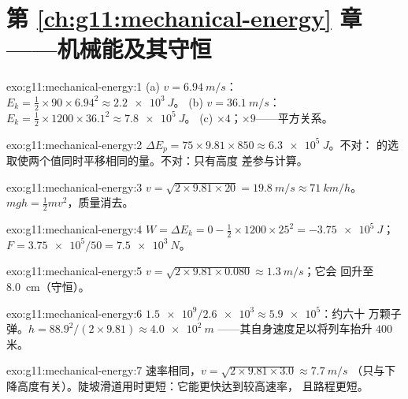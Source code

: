 \section*{第 \ref{ch:g11:mechanical-energy} 章——机械能及其守恒}

\begin{solution}{exo:g11:mechanical-energy:1}
(a) $v = \qty{6.94}{m/s}$：
$E_k = \tfrac12 \times 90 \times 6.94^2 \approx \qty{2.2e3}{J}$。
(b) $v = \qty{36.1}{m/s}$：
$E_k = \tfrac12 \times 1200 \times 36.1^2 \approx \qty{7.8e5}{J}$。
(c) $\times 4$；$\times 9$——平方关系。
\end{solution}

\begin{solution}{exo:g11:mechanical-energy:2}
$\Delta E_p = 75 \times 9.81 \times 850 \approx \qty{6.3e5}{J}$。不对：
的选取使两个值同时平移相同的量。不对：只有高度
差参与计算。
\end{solution}

\begin{solution}{exo:g11:mechanical-energy:3}
$v = \sqrt{2 \times 9.81 \times 20} = \qty{19.8}{m/s} \approx
\qty{71}{km/h}$。$mgh = \tfrac12 mv^2$，质量消去。
\end{solution}

\begin{solution}{exo:g11:mechanical-energy:4}
$W = \Delta E_k = 0 - \tfrac12 \times 1200 \times 25^2 =
\qty{-3.75e5}{J}$；$F = \num{3.75e5}/50 = \qty{7.5e3}{N}$。
\end{solution}

\begin{solution}{exo:g11:mechanical-energy:5}
$v = \sqrt{2 \times 9.81 \times 0.080} \approx \qty{1.3}{m/s}$；它会
回升至 \qty{8.0}{cm}（守恒）。
\end{solution}

\begin{solution}{exo:g11:mechanical-energy:6}
$\num{1.5e9}/\num{2.6e3} \approx \num{5.9e5}$：约六十
万颗子弹。$h = 88.9^2/(2 \times 9.81) \approx \qty{4.0e2}{m}$
——其自身速度足以将列车抬升 $400$ 米。
\end{solution}

\begin{solution}{exo:g11:mechanical-energy:7}
速率相同，$v = \sqrt{2 \times 9.81 \times 3.0} \approx \qty{7.7}{m/s}$
（只与下降高度有关）。陡坡滑道用时更短：它能更快达到较高速率，
且路程更短。
\end{solution}


